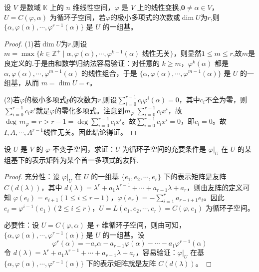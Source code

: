 \documentclass[../../main.tex]{subfiles}
\begin{document}
\begin{theorem}\label{theorem:循环子空间的基}
设 \(V\) 是数域 \(\mathbb{K}\) 上的 \(n\) 维线性空间，\(\varphi\) 是 \(V\) 上的线性变换,\(\mathbf{0}\neq\alpha\in V\)， \(U = C(\varphi,\alpha)\) 为循环子空间，若$\varphi$的极小多项式的次数或$\dim U$为$r$,则\(\{\alpha,\varphi(\alpha),\cdots,\varphi^{r - 1}(\alpha)\}\) 是 \(U\) 的一组基。
\end{theorem}
\begin{proof}
(1)若$\dim U$为$r$,则设 \(m = \max\{k\in\mathbb{Z}^+\mid\alpha,\varphi(\alpha),\cdots,\varphi^{k - 1}(\alpha)\text{ 线性无关}\}\)，则显然$1\leqslant  m\leqslant  r$,故$m$是良定义的.于是由和数学归纳法容易验证：对任意的 \(k\geqslant  m\)，\(\varphi^k(\alpha)\) 都是 \(\alpha,\varphi(\alpha),\cdots,\varphi^{m - 1}(\alpha)\) 的线性组合，于是 \(\{\alpha,\varphi(\alpha),\cdots,\varphi^{m - 1}(\alpha)\}\) 是 \(U\) 的一组基，从而 \(m = \dim U = r\)。 

(2)若$\varphi$的极小多项式$p$的次数为$r$,则设$\sum_{i=0}^{r-1}c_i\varphi^i(\alpha)=0$，其中$c_i$不全为零，则$\sum_{i=0}^{r-1}c_ix^i$就是$\varphi$的零化多项式。注意到$m_{\varphi}|\sum_{i=0}^{r-1}c_ix^i$，故$\deg\,m_{\varphi}=r>r-1=\deg\sum_{i=0}^{r-1}c_ix^i$。故$\sum_{i=0}^{r-1}c_ix^i=0$，即$c_i=0$。故$I,A,\cdots,A^{r-1}$线性无关。因此结论得证。

\end{proof}

\begin{theorem}\label{theorem:不变子空间是循环子空间的充要条件}
设 \(U\) 是 \(V\) 的 \(\varphi\)-不变子空间，求证：\(U\) 为循环子空间的充要条件是 \(\varphi|_U\) 在 \(U\) 的某组基下的表示矩阵为某个首一多项式的友阵.
\end{theorem}
\begin{proof}
{\heiti 充分性：}设 \(\varphi|_U\) 在 \(U\) 的一组基 \(\{e_1,e_2,\cdots,e_r\}\) 下的表示矩阵是友阵 \(C(d(\lambda))\)，其中 \(d(\lambda)=\lambda^r + a_1\lambda^{r - 1}+\cdots + a_{r - 1}\lambda + a_r\)，则由\hyperref[proposition:多项式的友矩和Frobenius块]{友阵的定义}可知 \(\varphi(e_i)=e_{i + 1}(1\leqslant  i\leqslant  r - 1)\)，\(\varphi(e_r)=-\sum_{i = 1}^{r}a_{r - i + 1}e_i\)。因此 \(e_i=\varphi^{i - 1}(e_1)(2\leqslant  i\leqslant  r)\)，\(U = L(e_1,e_2,\cdots,e_r)=C(\varphi,e_1)\) 为循环子空间。

{\heiti 必要性：}设 \(U = C(\varphi,\alpha)\) 是 \(r\) 维循环子空间，则由可知，\(\{\alpha,\varphi(\alpha),\cdots,\varphi^{r - 1}(\alpha)\}\) 是 \(U\) 的一组基。设 
\[
\varphi^r(\alpha)=-a_r\alpha - a_{r - 1}\varphi(\alpha)-\cdots - a_1\varphi^{r - 1}(\alpha)
\]
令 \(d(\lambda)=\lambda^r + a_1\lambda^{r - 1}+\cdots + a_{r - 1}\lambda + a_r\)，容易验证：\(\varphi|_U\) 在基 \(\{\alpha,\varphi(\alpha),\cdots,\varphi^{r - 1}(\alpha)\}\) 下的表示矩阵就是友阵 \(C(d(\lambda))\)。

\end{proof}
\end{document}
